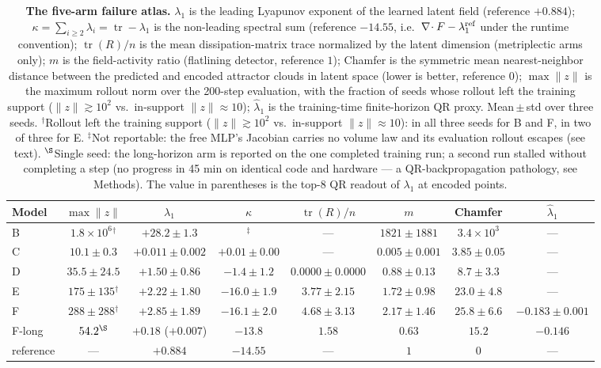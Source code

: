 \documentclass[11pt]{article}
\newcommand{\tr}{\operatorname{tr}}
\newcommand{\grad}{\nabla}
\begin{document}
\begin{table}[t]
\centering
\caption{\textbf{The five-arm failure atlas.} $\lambda_1$ is the leading
Lyapunov exponent of the learned latent field (reference $+0.884$);
$\kappa=\sum_{i\ge2}\lambda_i=\tr-\lambda_1$ is the non-leading spectral
sum (reference $-14.55$, i.e.\ $\grad\!\cdot F-\lambda_1^{\rm ref}$ under
the runtime convention); $\tr(R)/n$ is the mean dissipation-matrix trace
normalized by the latent dimension (metriplectic arms only); $m$ is the
field-activity ratio (flatlining detector, reference $1$); Chamfer is the
symmetric mean nearest-neighbor distance between the predicted and
encoded attractor clouds in latent space (lower is better, reference
$0$); $\max\|z\|$ is the maximum rollout norm over the 200-step
evaluation, with the fraction of seeds whose rollout left the training
support ($\|z\|\gtrsim10^2$ vs.\ in-support $\|z\|\approx10$);
$\hat\lambda_1$ is the training-time finite-horizon QR proxy.
Mean\,$\pm$\,std over three seeds. ${}^\dagger$Rollout left the training
support ($\|z\|\gtrsim10^2$ vs.\ in-support $\|z\|\approx10$): in all three seeds for B and F, in two of three for E. ${}^\ddagger$Not
reportable: the free MLP's Jacobian carries no volume law and its
evaluation rollout escapes (see text). ${}^\S$Single seed: the
long-horizon arm is reported on the one completed training run; a second
run stalled without completing a step (no progress in 45 min on
identical code and hardware --- a QR-backpropagation pathology, see
Methods). The value in parentheses is the top-8 QR readout of
$\lambda_1$ at encoded points.}
\label{tab:atlas}
\begingroup\footnotesize\setlength{\tabcolsep}{3pt}
\begin{tabular}{lccccccc}
\toprule
Model & $\max\|z\|$ & $\lambda_1$ & $\kappa$ & $\tr(R)/n$ & $m$ & Chamfer & $\hat\lambda_1$ \\
\midrule
B & $1.8{\times}10^6{}^{\dagger}$ & $+28.2\pm1.3$ & ${}^{\ddagger}$ & --- & $1821\pm1881$ & $3.4{\times}10^3$ & --- \\
C & $10.1\pm0.3$ & $+0.011\pm0.002$ & $+0.01\pm0.00$ & --- & $0.005\pm0.001$ & $3.85\pm0.05$ & --- \\
D & $35.5\pm24.5$ & $+1.50\pm0.86$ & $-1.4\pm1.2$ & $0.0000\pm0.0000$ & $0.88\pm0.13$ & $8.7\pm3.3$ & --- \\
E & $175\pm135{}^{\dagger}$ & $+2.22\pm1.80$ & $-16.0\pm1.9$ & $3.77\pm2.15$ & $1.72\pm0.98$ & $23.0\pm4.8$ & --- \\
F & $288\pm288{}^{\dagger}$ & $+2.85\pm1.89$ & $-16.1\pm2.0$ & $4.68\pm3.13$ & $2.17\pm1.46$ & $25.8\pm6.6$ & $-0.183\pm0.001$ \\
F-long & $54.2{}^{\S}$ & $+0.18$ ($+0.007$)& $-13.8$ & $1.58$ & $0.63$ & $15.2$ & $-0.146$ \\
\midrule
reference & --- & $+0.884$ & $-14.55$ & --- & $1$ & $0$ & --- \\
\bottomrule
\end{tabular}
\endgroup
\end{table}
\end{document}
